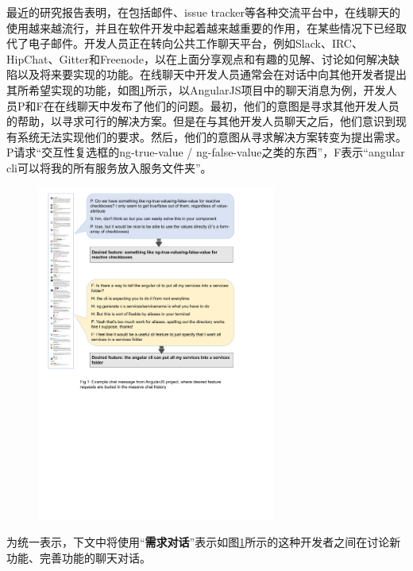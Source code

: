 最近的研究报告表明，在包括邮件、issue tracker等各种交流平台中，在线聊天的使用越来越流行，并且在软件开发中起着越来越重要的作用，在某些情况下已经取代了电子邮件\cite{lin2016developers}。开发人员正在转向公共工作聊天平台，例如Slack、IRC、HipChat、Gitter和Freenode，以在上面分享观点和有趣的见解、讨论如何解决缺陷以及将来要实现的功能\cite{chatterjee2019exploratory}。在线聊天中开发人员通常会在对话中向其他开发者提出其所希望实现的功能，如图\ref{fig:motivation}所示，以AngularJS项目中的聊天消息为例，开发人员P和F在在线聊天中发布了他们的问题。最初，他们的意图是寻求其他开发人员的帮助，以寻求可行的解决方案。但是在与其他开发人员聊天之后，他们意识到现有系统无法实现他们的要求。然后，他们的意图从寻求解决方案转变为提出需求。P请求“交互性复选框的ng-true-value / ng-false-value之类的东西”，F表示“angular cli可以将我的所有服务放入服务文件夹”。
\begin{figure}[htbp]
    \centering
    \includegraphics[width=0.70\textwidth]{Img/motivation.pdf}
    \label{fig:motivation}
\end{figure}
为统一表示，下文中将使用“\textbf{需求对话}”表示如图\ref{fig:motivation}所示的这种开发者之间在讨论新功能、完善功能的聊天对话。

